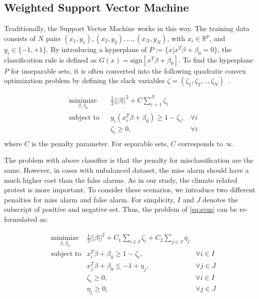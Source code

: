 \subsection{Weighted Support Vector Machine}

Traditionally, the Support Vector Machine works in this way. The training data consists of $N$ pairs $(x_1,y_1),(x_2,y_2),...,(x_N,y_N)$, with $x_i\in \mathbb{R}^p$, and $y_i \in \{-1,+1\}$. By introducing a hyperplane of $P:=\{x| x^T\beta+\beta_0=0\}$, the classification rule is defined as $G(x)=\text{sign}[x^T\beta+\beta_0].$ To find the hyperplane $P$ for inseparable sets, it is often converted into the following quadratic convex optimization problem by defining the slack variables $\zeta=(\zeta_1,\zeta_2,..,\zeta_N)$~\cite{hastie2005elements}.

\begin{equation}
    \label{eq:svm}
    \begin{aligned}
& \underset{\beta, \beta_0}{\text{minimize}}
    & & \frac 1 2||\beta||^2 +C \sum_{i=1}^N \zeta_i \\
    & \text{subject to}
        & & y_i(x_i^T\beta+\beta_0) \ge 1-\zeta_i,&\forall i  \\
        & & & \zeta_i \ge 0, &\forall i \\
    \end{aligned}
\end{equation}
where $C$ is the penalty parameter. For separable sets, $C$ corresponds to $\infty$.


The problem with above classifier is that the penalty for misclassification are the same. However, in cases with unbalanced dataset, the miss alarm should have a much higher cost than the false alarms. As in our study, the climate related protest is more important. To consider these scenarios, we introduce two different penalties for miss alarm and false alarm. For simplicity, $I$ and $J$ denotes the subscript of positive and negative set. Thus, the problem of \ref{eq:svm} can be re-formulated as:

\begin{equation}
\label{eq:svm2}
\begin{aligned}
    & \underset{\beta, \beta_0}{\text{minimize}} & \frac 1 2||\beta||^2 + C_1 \sum_{i\in I} \zeta_i + C_2 \sum_{j\in J} \eta_j \\
    & \text{subject to} & x_i^T\beta+\beta_0 \ge 1-\zeta_i,&\forall i \in I  \\
      & & x_j^T\beta+\beta_0 \leq -1+\eta_j,&\forall j \in J  \\
      && \zeta_i \ge 0,&\forall i \in I  \\
      && \eta_j \ge 0,&\forall j \in J  \\
\end{aligned}
\end{equation}

